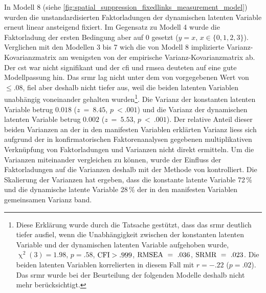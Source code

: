 \documentclass[11pt, twoside, a4paper]{book}		%
\begin{document}
In Modell 8 (siehe \autoref{fig:spatial_suppression_fixedlinks_measurement_model}) wurden die unstandardisierten Faktorladungen der dynamischen latenten Variable erneut linear ansteigend fixiert.
Im Gegensatz zu Modell 4 wurde die Faktorladung der ersten Bedingung aber auf 0 gesetzt ($y=x,\,x\in\{0, 1, 2, 3\}$).
Verglichen mit den Modellen 3 bis 7 wich die von Modell 8 implizierte Var\-ianz-Ko\-var\-ianz\-ma\-trix am wenigsten von der empirische Var\-ianz-Ko\-var\-ianz\-ma\-trix ab. Der \gls{cst} war nicht signifikant und der \gls{cfi} und \gls{rmsea} deuteten auf eine gute Modellpassung hin. 
Das \gls{srmr}  lag nicht unter dem von \citet{Hu1999} vorgegebenen Wert von $\leq.08$, fiel aber deshalb  nicht tiefer aus, weil die beiden latenten Variablen unabhängig voneinander gehalten wurden\footnote{Diese Erklärung wurde durch die Tatsache gestützt, dass das \gls{srmr} deutlich tiefer ausfiel, wenn die Unabhängigkeit zwischen der konstanten latenten Variable und der dynamischen latenten Variable aufgehoben wurde, $\upchi^2(3)=1.98$, $p=.58$, $\textnormal{CFI}>.999$, $\textnormal{RMSEA}~=~.036$, $\textnormal{SRMR}~=~.023$. Die beiden latenten Variablen korrelierten in diesem Fall mit $r=-.22$ ($p=.02$). Das \gls{srmr} wurde bei der Beurteilung der folgenden Modelle deshalb nicht mehr berücksichtigt.}. 
Die Varianz der konstanten latenten Variable betrug $0.018$ ($z~=~8.45$, $p~<.001$) und die Varianz der dynamischen latenten Variable betrug $0.002$ ($z~=~5.53$, $p~<~.001$). 
Der relative Anteil dieser beiden Varianzen an der in den manifesten Variablen erklärten Varianz liess sich aufgrund der in konfirmatorischen Faktorenanalysen gegebenen multiplikativen Verknüpfung von Faktorladungen und Varianzen nicht direkt ermitteln. Um die Varianzen miteinander vergleichen zu können, wurde der Einfluss der Faktorladungen auf die Varianzen deshalb mit der Methode von  \citet{Schweizer2011a} kontrolliert. Die Skalierung der Varianzen hat ergeben, dass die konstante latente Variable 72\,\% und die dynamische latente Variable 28\,\% der in den manifesten Variablen gemeinsamen Varianz band.
\end{document}
